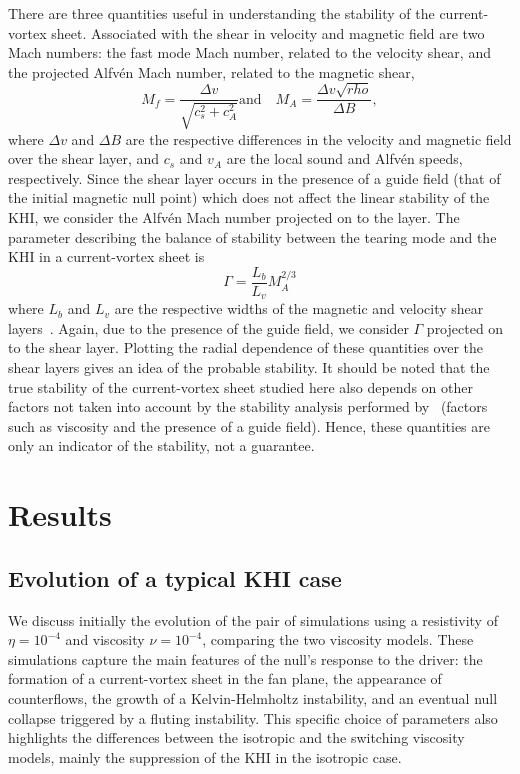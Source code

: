 There are three quantities useful in understanding the stability of the current-vortex sheet. Associated with the shear in velocity and magnetic field are two Mach numbers: the fast mode Mach number, related to the velocity shear, and the projected Alfv\'en Mach number, related to the magnetic shear,
\begin{equation}
  \label{eq:mach_numbers}
  M_f = \frac{\Delta v}{\sqrt{c_s^2 + c_A^2}} \text{and} \quad M_A = \frac{\Delta v \sqrt{rho}}{\Delta B},
\end{equation}
where $\Delta v$ and $\Delta B$ are the respective differences in the velocity and magnetic field over the shear layer, and $c_s$ and $v_A$ are the local sound and Alfv\'en speeds, respectively. Since the shear layer occurs in the presence of a guide field (that of the initial magnetic null point) which does not affect the linear stability of the KHI, we consider the Alfv\'en Mach number projected on to the layer. The parameter describing the balance of stability between the tearing mode and the KHI in a current-vortex sheet is
\begin{equation}
  \label{eq:khi_stability_param}
  \Gamma = \frac{L_b}{L_v} M_A^{2/3}
\end{equation}
where $L_b$ and $L_v$ are the respective widths of the magnetic and velocity shear layers~\cite{einaudiResistiveInstabilitiesFlowing1986}. Again, due to the presence of the guide field, we consider $\Gamma$ projected on to the shear layer. Plotting the radial dependence of these quantities over the shear layers gives an idea of the probable stability. It should be noted that the true stability of the current-vortex sheet studied here also depends on other factors not taken into account by the stability analysis performed by~\cite{einaudiResistiveInstabilitiesFlowing1986} (factors such as viscosity and the presence of a guide field). Hence, these quantities are only an indicator of the stability, not a guarantee.

\section{Results}

\subsection{Evolution of a typical KHI case}
\label{sec:null_point_khi_single_case}

We discuss initially the evolution of the pair of simulations using a resistivity of $\eta = 10^{-4}$ and viscosity $\nu = 10^{-4}$, comparing the two viscosity models. These simulations capture the main features of the null's response to the driver: the formation of a current-vortex sheet in the fan plane, the appearance of counterflows, the growth of a Kelvin-Helmholtz instability, and an eventual null collapse triggered by a fluting instability. This specific choice of parameters also highlights the differences between the isotropic and the switching viscosity models, mainly the suppression of the KHI in the isotropic case.

